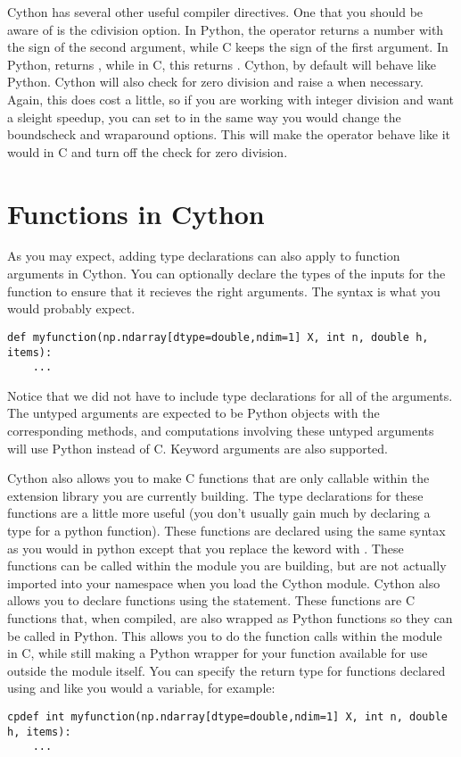 Cython has several other useful compiler directives.
One that you should be aware of is the cdivision option.
In Python, the \li{\%} operator returns a number with the sign of the second argument, while C keeps the sign of the first argument.
In Python,  returns , while in C, this returns .
Cython, by default will behave like Python.
Cython will also check for zero division and raise a  when necessary.
Again, this does cost a little, so if you are working with integer division and want a sleight speedup, you can set  to  in the same way you would change the boundscheck and wraparound options.
This will make the \li{\%} operator behave like it would in C and turn off the check for zero division.

\section*{Functions in Cython}

As you may expect, adding type declarations can also apply to function arguments in Cython.
You can optionally declare the types of the inputs for the function to ensure that it recieves the right arguments.
The syntax is what you would probably expect.
\begin{lstlisting}
def myfunction(np.ndarray[dtype=double,ndim=1] X, int n, double h, items):
	...
\end{lstlisting}

Notice that we did not have to include type declarations for all of the arguments.
The untyped arguments are expected to be Python objects with the corresponding methods, and computations involving these untyped arguments will use Python instead of C.
Keyword arguments are also supported.

Cython also allows you to make C functions that are only callable within the extension library you are currently building.
The type declarations for these functions are a little more useful (you don't usually gain much by declaring a type for a python function).
These functions are declared using the same syntax as you would in python except that you replace the keword  with .
These functions can be called within the module you are building, but are not actually imported into your namespace when you load the Cython module.
Cython also allows you to declare functions using the  statement.
These functions are C functions that, when compiled, are also wrapped as Python functions so they can be called in Python.
This allows you to do the function calls within the module in C, while still making a Python wrapper for your function available for use outside the module itself.
You can specify the return type for functions declared using  and  like you would a variable, for example:
\begin{lstlisting}
cpdef int myfunction(np.ndarray[dtype=double,ndim=1] X, int n, double h, items):
	...
\end{lstlisting}

